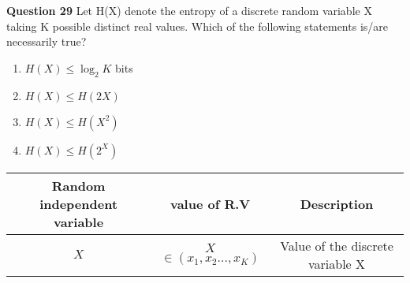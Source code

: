 \documentclass[journal,12pt,onecolumn]{IEEEtran}
\theoremstyle{remark}
\begin{document}
%
\textbf{Question 29}
Let H(X) denote the entropy of a discrete
random variable X taking K possible distinct
real values. Which of the following statements
is/are necessarily true?
\begin{enumerate}[label=(\Alph*)]
\item 
$H(X)\leq \log _{2} K$ bits\\
\item 
$H(X) \leq H(2X)$\\
\item
$H(X)\leq H(X^2)$\\
\item
$H(X) \leq H(2^X)$\\
\end{enumerate}
\solution
\begin{table}[htpb]
\centering 
\begin{tabular}{|c|c|c|}
\hline
Random independent variable	&	value	of R.V		   &Description\\
\hline
$X$                         & $X$ $\in(x_1,x_2 ... ,x_K)$                                & Value of the discrete variable X\\
\hline
\end{tabular}
\end{table}
\end{document}
